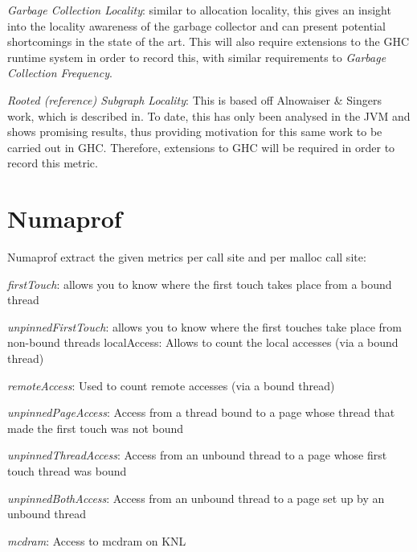 \documentclass[a4paper,11pt]{article}
\begin{document}
\begin{description}
\item \textit{Garbage Collection Locality}: similar to allocation locality, this gives an insight into the locality awareness of the garbage collector and can present potential shortcomings in the state of the art. This will also require extensions to the GHC runtime system in order to record this, with similar requirements to \textit{Garbage Collection Frequency}.
\item \textit{Rooted (reference) Subgraph Locality}: This is based off Alnowaiser \& Singers work, which is described in. To date, this has only been analysed in the JVM and shows promising results, thus providing motivation for this same work to be carried out in GHC. Therefore, extensions to GHC will be required in order to record this metric.

\end{description}

\section{Numaprof}

Numaprof extract the given metrics per call site and per malloc call site:

\begin{description}
\item \textit{firstTouch}: allows you to know where the first touch takes place from a bound thread
\item \textit{unpinnedFirstTouch}: allows you to know where the first touches take place from non-bound threads
localAccess: Allows to count the local accesses (via a bound thread)
\item \textit{remoteAccess}: Used to count remote accesses (via a bound thread)
\item \textit{unpinnedPageAccess}: Access from a thread bound to a page whose thread that made the first touch was not bound
\item \textit{unpinnedThreadAccess}: Access from an unbound thread to a page whose first touch thread was bound
\item \textit{unpinnedBothAccess}: Access from an unbound thread to a page set up by an unbound thread
\item \textit{mcdram}: Access to mcdram on KNL
\end{description}
\end{document}
